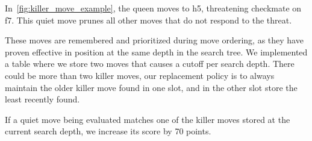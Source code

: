 \noindent In~\cref{fig:killer_move_example}, the queen moves to h5, threatening checkmate on f7. This quiet move prunes all other moves that do not respond to the threat.

\noindent These moves are remembered and prioritized during move ordering, as they have proven effective in position at the same depth in the search tree. We implemented a table where we store two moves that causes a cutoff per search depth. There could be more than two killer moves, our replacement policy is to always maintain the older killer move found in one slot, and in the other slot store the least recently found.

\vspace{1em}

\noindent If a quiet move being evaluated matches one of the killer moves stored at the current search depth, we increase its score by 70 points.